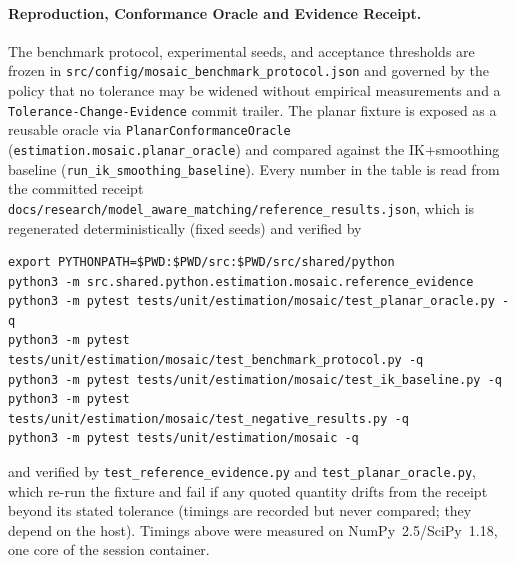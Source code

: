 \documentclass[11pt,a4paper]{article}
\begin{document}
\paragraph{Reproduction, Conformance Oracle and Evidence Receipt.}
The benchmark protocol, experimental seeds, and acceptance thresholds are frozen in
\texttt{src/config/mosaic\_benchmark\_protocol.json} and governed by the policy that no
tolerance may be widened without empirical measurements and a
\texttt{Tolerance-Change-Evidence} commit trailer.
The planar fixture is exposed as a reusable oracle via
\texttt{PlanarConformanceOracle} (\texttt{estimation.mosaic.planar\_oracle}) and compared
against the IK+smoothing baseline (\texttt{run\_ik\_smoothing\_baseline}).
Every number in the table is read from the committed receipt
\texttt{docs/research/model\_aware\_matching/reference\_results.json}, which is
regenerated deterministically (fixed seeds) and verified by
\begin{verbatim}
export PYTHONPATH=$PWD:$PWD/src:$PWD/src/shared/python
python3 -m src.shared.python.estimation.mosaic.reference_evidence
python3 -m pytest tests/unit/estimation/mosaic/test_planar_oracle.py -q
python3 -m pytest tests/unit/estimation/mosaic/test_benchmark_protocol.py -q
python3 -m pytest tests/unit/estimation/mosaic/test_ik_baseline.py -q
python3 -m pytest tests/unit/estimation/mosaic/test_negative_results.py -q
python3 -m pytest tests/unit/estimation/mosaic -q
\end{verbatim}
and verified by \texttt{test\_reference\_evidence.py} and \texttt{test\_planar\_oracle.py},
which re-run the fixture and fail if any quoted quantity drifts from the receipt beyond its
stated tolerance (timings are recorded but never compared; they depend on the host).
Timings above were measured on NumPy~2.5/SciPy~1.18, one core of the session container.
\end{document}
